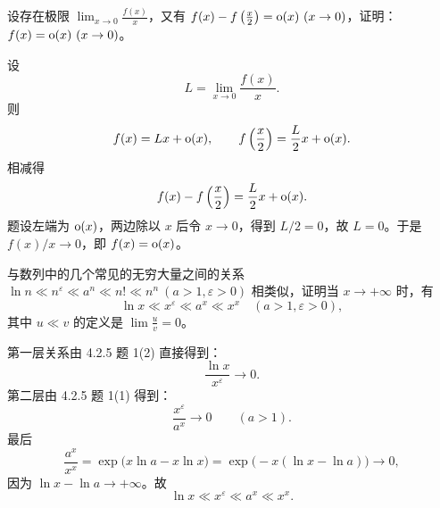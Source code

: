 \begin{xexercise}[2]
设存在极限 $\displaystyle\lim_{x\to0}\frac{f(x)}x$，又有 $f(x)-f\left(\frac x2\right)=\littleo(x)\ (x\to0)$，证明：$f(x)=\littleo(x)\ (x\to0)$。
\end{xexercise}
\begin{xsolution}
设
\[
  L=\lim_{x\to0}\frac{f(x)}x.
\]
则
\[
  f(x)=Lx+\mathrm{o}(x),
  \qquad
  f\left(\frac x2\right)=\frac L2x+\mathrm{o}(x).
\]
相减得
\[
  f(x)-f\left(\frac x2\right)=\frac L2x+\mathrm{o}(x).
\]
题设左端为 $\mathrm{o}(x)$，两边除以 $x$ 后令 $x\to0$，得到 $L/2=0$，故 $L=0$。于是
$f(x)/x\to0$，即 $f(x)=\mathrm{o}(x)$。
\end{xsolution}


\begin{xexercise}[3]
与数列中的几个常见的无穷大量之间的关系 $\ln n\ll n^\varepsilon\ll a^n\ll n!\ll n^n\ (a>1,\varepsilon>0)$ 相类似，证明当 $x\to+\infty$ 时，有
  \[
    \ln x\ll x^\varepsilon\ll a^x\ll x^x\quad(a>1,\varepsilon>0),
  \]
  其中 $u\ll v$ 的定义是 $\displaystyle\lim\frac uv=0$。
\end{xexercise}
\begin{xsolution}
第一层关系由 4.2.5 题 1(2) 直接得到：
\[
  \frac{\ln x}{x^\varepsilon}\to0.
\]
第二层由 4.2.5 题 1(1) 得到：
\[
  \frac{x^\varepsilon}{a^x}\to0\qquad(a>1).
\]
最后
\[
  \frac{a^x}{x^x}
  =\exp\bigl(x\ln a-x\ln x\bigr)
  =\exp\bigl(-x(\ln x-\ln a)\bigr)\to0,
\]
因为 $\ln x-\ln a\to+\infty$。故
\[
  \ln x\ll x^\varepsilon\ll a^x\ll x^x.
\]
\end{xsolution}


